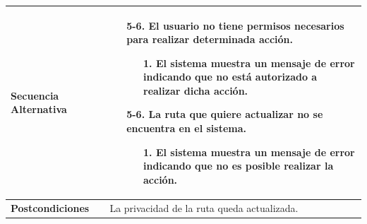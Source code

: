 \begin{longtable}{| p{4cm} | p{10cm} |}
\hline
\textbf{Secuencia Alternativa} &\mbox{}\par\vspace{-\baselineskip}
\begin{enumerate}[leftmargin=0.9cm, topsep=0.1cm]
\item[5-6.] El usuario no tiene permisos necesarios para realizar determinada acción.
	\begin{itemize}
	\item[1.] El sistema muestra un mensaje de error indicando que no está autorizado a realizar dicha acción.
	\end{itemize}
\item[5-6.] La ruta que quiere actualizar no se encuentra en el sistema.
	\begin{itemize}
	\item[1.] El sistema muestra un mensaje de error indicando que no es posible realizar la acción.
	\end{itemize}
\end{enumerate}
\\

\hline
\textbf{Postcondiciones} & 
La privacidad de la ruta queda actualizada.\\
\hline
\end{longtable}



\newpage
